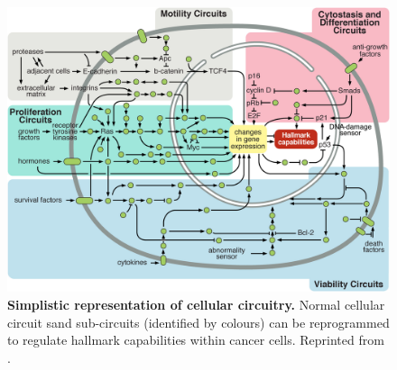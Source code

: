 \documentclass[a4paper,12pt,twoside,onecolumn,openright,final,oldfontcommands]{memoir}
\begin{document}
\begin{figure}

{\centering \includegraphics[width=0.9\linewidth]{fig/circuit} 

}

\caption[Simplistic representation of cellular circuit and pathways]{\textbf{Simplistic representation of cellular
circuitry.} Normal cellular circuit sand sub-circuits (identified by
colours) can be reprogrammed to regulate hallmark capabilities within
cancer cells. Reprinted from \citet{hanahan2011hallmarks}.}\label{fig:circuit}
\end{figure}
\end{document}
